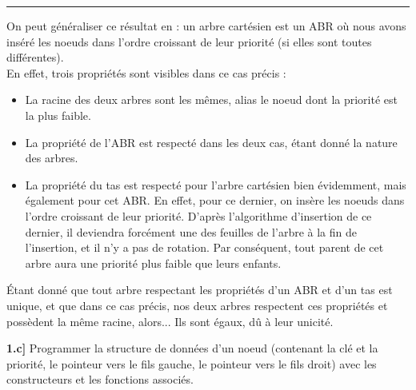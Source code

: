 \documentclass[a4paper,12pt]{report}
\begin{document}
\begin{tcolorbox}[colback=gray!10, colframe=blue!30, coltitle=black, title=Réponse à la 1.b - 1/1]
    \vspace{0.5cm}
    \hrule
    \vspace{0.5cm}

    On peut généraliser ce résultat en : un arbre cartésien est un ABR où nous avons inséré les noeuds dans l'ordre croissant de leur priorité (si elles sont toutes différentes).\\

    En effet, trois propriétés sont visibles dans ce cas précis :\\[-0.4cm]
    \begin{itemize}
        \item La racine des deux arbres sont les mêmes, alias le noeud dont la priorité est la plus faible.
        \item La propriété de l'ABR est respecté dans les deux cas, étant donné la nature des arbres.
        \item La propriété du tas est respecté pour l'arbre cartésien bien évidemment, mais également pour cet ABR. En effet, pour ce dernier, 
            on insère les noeuds dans l'ordre croissant de leur priorité. D'après l'algorithme d'insertion de ce dernier, il deviendra forcément une des 
            feuilles de l'arbre à la fin de l'insertion, et il n'y a pas de rotation. Par conséquent, tout parent de cet arbre aura une priorité plus 
            faible que leurs enfants.
    \end{itemize}

    \vspace{0.5cm}

    Étant donné que tout arbre respectant les propriétés d'un ABR et d'un tas est unique, et que dans ce cas précis, nos deux arbres respectent ces 
        propriétés et possèdent la même racine, alors... Ils sont égaux, dû à leur unicité.

\end{tcolorbox}




\newpage
{}

\textbf{1.c]} Programmer la structure de données d'un noeud (contenant la clé et la priorité, le pointeur vers le fils gauche, le pointeur vers le fils droit) 
    avec les constructeurs et les fonctions associés.
\end{document}
